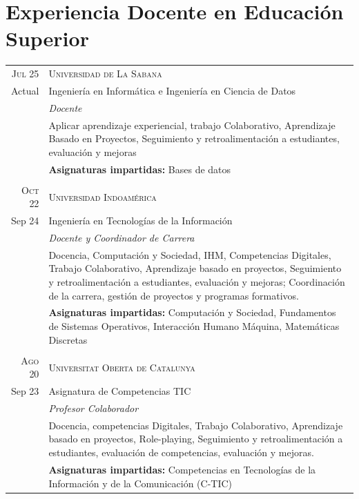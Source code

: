 \documentclass[a4paper]{article}
\begin{document}
\section{Experiencia Docente en Educación Superior}
\begin{longtable}{r|p{12cm}}



\textsc{Jul 25} & \textsc{Universidad de La Sabana} \\
Actual & Ingeniería en Informática e Ingeniería en Ciencia de Datos\\
&\emph{Docente}\\
&\footnotesize{Aplicar aprendizaje experiencial, trabajo Colaborativo, Aprendizaje Basado en Proyectos, Seguimiento y retroalimentación  a estudiantes, evaluación y mejoras}\\& \footnotesize{\textbf{Asignaturas impartidas:} Bases de datos}\\

\multicolumn{2}{c}{} \\
\textsc{Oct 22} & \textsc{Universidad Indoamérica} \\
Sep 24 & Ingeniería en Tecnologías de la Información\\
&\emph{Docente y Coordinador de Carrera}\\
&\footnotesize{Docencia, Computación y Sociedad, IHM, Competencias Digitales, Trabajo Colaborativo, Aprendizaje basado en proyectos, Seguimiento y retroalimentación  a estudiantes, evaluación y mejoras; Coordinación de la carrera, gestión de proyectos y programas formativos.}\\& \footnotesize{\textbf{Asignaturas impartidas:} Computación y Sociedad, Fundamentos de Sistemas Operativos, Interacción Humano Máquina, Matemáticas Discretas}\\

\multicolumn{2}{c}{} \\
\textsc{Ago 20} & \textsc{Universitat Oberta de Catalunya} \\
Sep 23& Asignatura de Competencias TIC\\
&\emph{Profesor Colaborador}\\
&\footnotesize{Docencia, competencias Digitales, Trabajo Colaborativo, Aprendizaje basado en proyectos, Role-playing, Seguimiento y retroalimentación  a estudiantes, evaluación de competencias, evaluación y mejoras.}\\ & \footnotesize{\textbf{Asignaturas impartidas:} Competencias en Tecnologías de la Información y de la Comunicación (C-TIC)}\\


\end{longtable}
\end{document}

